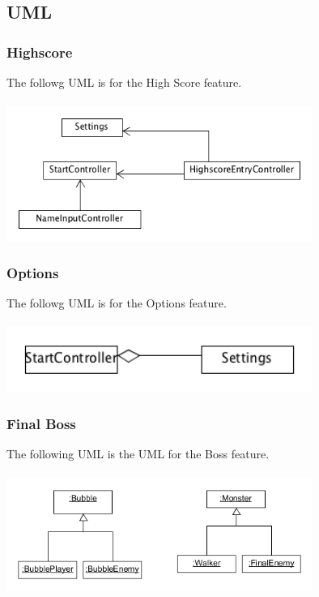 \subsection{UML}

\subsubsection{Highscore}

The followg UML is for the High Score feature.
\\\\
\includegraphics[width=100mm]{HighscoreUML.png}

\subsubsection{Options}
The followg UML is for the Options feature.
\\\\
\includegraphics[width=100mm]{Options_UML.png}

\subsubsection{Final Boss}

The following UML is the UML for the Boss feature.
\\\\
\includegraphics[width=100mm]{FinalEnemyUml.png}



